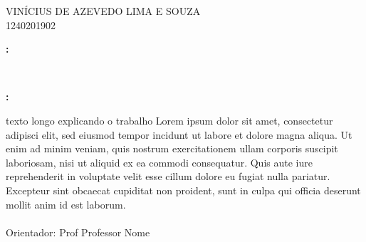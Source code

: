 \begin{center}

    \thispagestyle{empty}

    \begin{large}
        VINÍCIUS DE AZEVEDO LIMA E SOUZA \\ 1240201902
    \end{large}
    

    \vfill

    \begin{Large}
        \textbf{\uppercase\expandafter{\TitleNameEnglish}:} \\
        \textbf{\uppercase\expandafter{\SubtitleNameEnglish}}
    \end{Large} \\
    \begin{Large}
        \textbf{\uppercase\expandafter{\TitleName}:} \\
        \textbf{\uppercase\expandafter{\SubtitleName}}
    \end{Large}

\end{center}

\vspace{3em}

\begin{adjustwidth}{7.5cm}{}
    \noindent texto longo explicando o trabalho Lorem ipsum dolor sit amet, consectetur adipisci elit, sed eiusmod tempor incidunt ut labore et dolore magna aliqua. Ut enim ad minim veniam, quis nostrum exercitationem ullam corporis suscipit laboriosam, nisi ut aliquid ex ea commodi consequatur. Quis aute iure reprehenderit in voluptate velit esse cillum dolore eu fugiat nulla pariatur. Excepteur sint obcaecat cupiditat non proident, sunt in culpa qui officia deserunt mollit anim id est laborum. \\ \ \\
    Orientador: Prof Professor Nome
\end{adjustwidth}

\vfill

\begin{center}
    \begin{large}
        \printCity \\
        \the \year
    \end{large}
\end{center}

\newpage